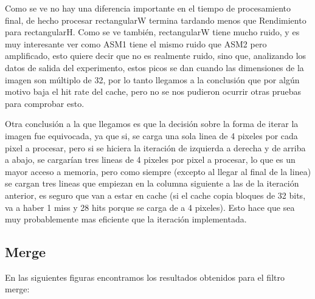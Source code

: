 \documentclass[a4paper]{article}
\begin{document}
Como se ve no hay una diferencia importante en el tiempo de procesamiento final, de hecho procesar rectangularW termina tardando menos que Rendimiento para rectangularH. Como se ve también, rectangularW tiene mucho ruido, y es muy interesante ver como ASM1 tiene el mismo ruido que ASM2 pero amplificado, esto quiere decir que no es realmente ruido, sino que, analizando los datos de salida del experimento, estos picos se dan cuando las dimensiones de la imagen son múltiplo de 32, por lo tanto llegamos a la conclusión que por algún motivo baja el hit rate del cache, pero no se nos pudieron ocurrir otras pruebas para comprobar esto.

Otra conclusión a la que llegamos es que la decisión sobre la forma de iterar la imagen fue equivocada, ya que si, se carga una sola linea de 4 pixeles por cada pixel a procesar, pero si se hiciera la iteración de izquierda a derecha y de arriba a abajo, se cargarían tres lineas de 4 pixeles por pixel a procesar, lo que es un mayor acceso a memoria, pero como siempre (excepto al llegar al final de la linea) se cargan tres lineas que empiezan en la columna siguiente a las de la iteración anterior, es seguro que van a estar en cache (si el cache copia bloques de 32 bits, va a haber 1 miss y 28 hits porque se carga de a 4 pixeles). Esto hace que sea muy probablemente mas eficiente que la iteración implementada.

\subsection{Merge}

En las siguientes figuras encontramos los resultados obtenidos para el filtro merge:
\end{document}
